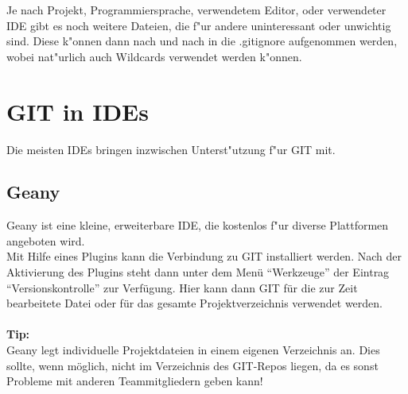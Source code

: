\documentclass[german,a4paper]{report}
\begin{document}
Je nach Projekt, Programmiersprache, verwendetem Editor, oder
verwendeter IDE gibt es noch weitere Dateien, die f"ur andere
uninteressant oder unwichtig sind. Diese k"onnen dann nach
und nach in die .gitignore aufgenommen werden, wobei nat"urlich
auch Wildcards verwendet werden k"onnen.

\chapter{GIT in IDEs}
Die meisten IDEs bringen inzwischen Unterst"utzung f"ur GIT mit.\\

\section{Geany}
Geany ist eine kleine, erweiterbare IDE, die kostenlos f"ur diverse
Plattformen angeboten wird.\\
Mit Hilfe eines Plugins kann die Verbindung zu GIT installiert werden.
Nach der Aktivierung des Plugins steht dann unter dem Menü ``Werkzeuge''
der Eintrag ``Versionskontrolle'' zur Verfügung. Hier kann dann
GIT für die zur Zeit bearbeitete Datei oder für das gesamte Projektverzeichnis
verwendet werden.\\
\\
\textbf{Tip:}\\
Geany legt individuelle Projektdateien in einem eigenen Verzeichnis an.
Dies sollte, wenn möglich, nicht im Verzeichnis des GIT-Repos liegen, da
es sonst Probleme mit anderen Teammitgliedern geben kann!
\end{document}
